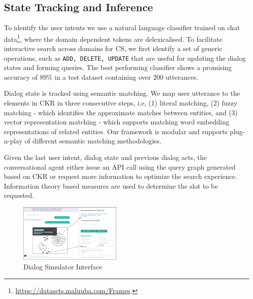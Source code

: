 \documentclass[letterpaper]{article} %
\begin{document}
\subsection{State Tracking and Inference}
To identify the user intents we use a natural language classifier \cite{yang2016hierarchical} trained on chat data\footnote{ \url{https://datasets.maluuba.com/Frames}.}, where the domain dependent tokens are delexicalised. To facilitate interactive search across domains for CS, we first identify a set of generic operations, such as {\texttt{ADD, DELETE, UPDATE}} that are useful for updating the dialog states and forming queries. 
The best performing classifier shows a promising accuracy of $89\%$ in a test dataset containing over $200$ utterances. %

Dialog state is tracked using semantic matching. We map user utterance to the elements in CKR in three consecutive steps, i.e, (1) literal matching, (2) fuzzy matching - which identifies the approximate matches between entities, and (3) vector representation matching - which supports matching word embedding representations of related entities.  
Our framework is modular and supports plug-n-play of different semantic matching methodologies.

Given the last user intent, dialog state and previous dialog acts, the conversational agent either issue an API call using the query graph generated based on CKR or request more information to optimize the search experience. Information theory based measures are used to determine the slot to be requested.

\begin{figure}[!ht]
    \centering
    \includegraphics[width=0.45\textwidth]{figures/woz.png}
    \caption{Dialog Simulator Interface}
    \label{fig:woz}
\end{figure}
\end{document}
